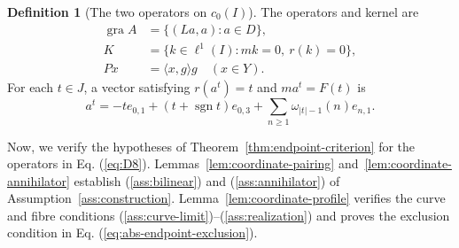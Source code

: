 \documentclass[11pt]{article}
\newcommand{\gra}{\operatorname{gra}}
\newcommand{\sgn}{\operatorname{sgn}}
\newcommand{\pair}[2]{\langle #1,#2\rangle}
\theoremstyle{definition}
\newtheorem{definition}{Definition}
\theoremstyle{remark}
\begin{document}
\begin{definition}[The two operators on $c_0(I)$]
The operators and kernel are
\begin{equation}
\begin{aligned}
\gra A&=\{(La,a):a\in D\},\\
K&=\{k\in\ell^1(I):mk=0,\ r(k)=0\},\\
Px&=\pair{x}{g}g\quad(x\in Y).
\end{aligned}
\label{eq:D8}
\end{equation}
For each $t\in J$, a vector satisfying $r(a^t)=t$ and $ma^t=F(t)$ is
\begin{equation}
a^t=-t e_{0,1}+(t+\sgn t)e_{0,3}
       +\sum_{n\ge1}\omega_{|t|-1}(n)e_{n,1}.
\label{eq:D9}
\end{equation}
\end{definition}

\label{sec:supporting}





Now, we verify the hypotheses of Theorem~\ref{thm:endpoint-criterion} for the operators in Eq. (\ref{eq:D8}). Lemmas~\ref{lem:coordinate-pairing} and~\ref{lem:coordinate-annihilator} establish \textup{(\ref{ass:bilinear})} and \textup{(\ref{ass:annihilator})} of Assumption~\ref{ass:construction}. Lemma~\ref{lem:coordinate-profile} verifies the curve and fibre conditions \textup{(\ref{ass:curve-limit})}--\textup{(\ref{ass:realization})} and proves the exclusion condition in Eq. (\ref{eq:abs-endpoint-exclusion}).
\end{document}
